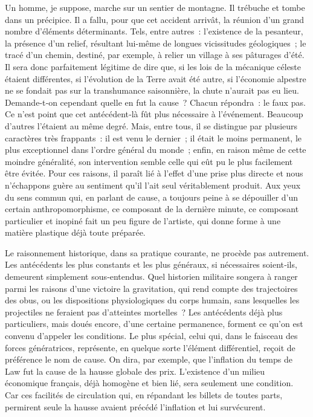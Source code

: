 \documentclass[french,twoside]{book} %
\begin{document}
\noindent Un homme, je suppose, marche sur un sentier de montagne. Il trébuche et tombe dans un précipice. Il a fallu, pour que cet accident arrivât, la réunion d’un grand nombre d’éléments déterminants. Tels, entre autres : l’existence de la pesanteur, la présence d’un relief, résultant lui-même de longues vicissitudes géologiques ; le tracé d’un chemin, destiné, par exemple, à relier un village à ses pâturages d’été. Il sera donc parfai­tement légitime de dire que, si les lois de la mécanique céleste étaient différentes, si l’évolution de la Terre avait été autre, si l’économie alpestre ne se fondait pas sur la transhumance saisonnière, la chute n’aurait pas eu lieu. Demande‑t‑on cependant quelle en fut la cause ? Chacun répon­dra : le faux pas. Ce n’est point que cet antécédent‑là fût plus nécessaire à l’événement. Beaucoup d’autres l’étaient au même degré. Mais, entre tous, il se distingue par plusieurs caractères très frappants : il est venu le dernier ; il était le moins permanent, le plus exceptionnel dans l’ordre  
\label{p100} général du monde ; enfin, en raison même de cette moindre généralité, son intervention semble celle qui eût pu le plus facilement être évitée. Pour ces raisons, il paraît lié à l’effet d’une prise plus directe et nous n’échappons guère au sentiment qu’il l’ait seul véritablement produit. Aux yeux du sens commun qui, en parlant de cause, a toujours peine à se dépouiller d’un certain anthropomorphisme, ce composant de la dernière minute, ce composant particulier et inopiné fait un peu figure de l’artiste, qui donne forme à une matière plastique déjà toute préparée.\par
Le raisonnement historique, dans sa pratique courante, ne procède pas autrement. Les antécédents les plus constants et les plus généraux, si nécessaires soient‑ils, demeurent simplement sous‑entendus. Quel historien militaire songera à ranger parmi les raisons d’une victoire la gravitation, qui rend compte des trajectoires des obus, ou les dispositions physiolo­giques du corps humain, sans lesquelles les projectiles ne feraient pas d’atteintes mortelles ? Les antécédents déjà plus particuliers, mais doués encore, d’une certaine permanence, forment ce qu’on est convenu d’appeler les conditions. Le plus spécial, celui qui, dans le faisceau des forces géné­ratrices, représente, en quelque sorte l’élément différentiel, reçoit de pré­férence le nom de cause. On dira, par exemple, que l’inflation du temps de Law fut la cause de la hausse globale des prix. L’existence d’un milieu économique français, déjà homogène et bien lié, sera seulement une condition. Car ces facilités de circulation qui, en répandant les billets de toutes parts, permirent seule la hausse avaient précédé l’inflation et lui survécurent.\par
\end{document}
